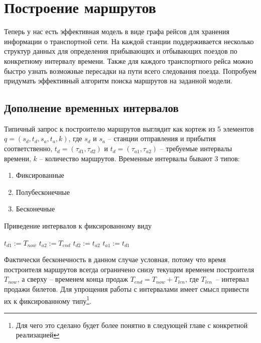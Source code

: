 \section{Построение маршрутов}
Теперь у нас есть эффективная модель в виде графа рейсов для хранения информации о транспортной сети. На каждой станции поддерживается несколько структур данных для определения прибывающих и отбывающих поездов по конкретному интервалу времени. Также для каждого транспортного рейса можно быстро узнать возможные пересадки на пути всего следования поезда. Попробуем придумать эффективный алгоритм поиска маршрутов на заданной модели.

\subsection{Дополнение временных интервалов}
Типичный запрос к построителю маршрутов выглядит как кортеж из 5 элементов $q = (s_d, t_d, s_a, t_a, k)$, где $s_d$ и $s_a$ -- станции отправления и прибытия соответственно, $t_d=(\tau_{d1}, \tau_{d2})$ и $t_d=(\tau_{a1}, \tau_{a2})$ -- требуемые интервалы времени, $k$ -- количество маршрутов. Временные интервалы бывают 3 типов:
\begin{enumerate}
	\item Фиксированные
	\item Полубесконечные
	\item Бесконечные
\end{enumerate}

\begin{algorithm}[!h]
	\caption{Приведение интервалов к фиксированному виду}\label{lst5}
	\begin{algorithmic}
			\State $t_{d1} := T_{now}$
		\EndIf
			\State $t_{a2} := T_{end}$
		\EndIf
			\State $t_{d2} := t_{a2}$
		\EndIf
			\State $t_{a1} := t_{d1}$
		\EndIf
		\EndFunction
	\end{algorithmic}
\end{algorithm}

Фактически бесконечность в данном случае условная, потому что время построителя маршрутов всегда ограничено снизу текущим временем построителя $T_{now}$, а сверху -- временем конца продаж $T_{end} = T_{now} + T_{len}$, где $T_{len}$~-- интервал продажи билетов. Для упрощения работы с интервалами имеет смысл привести их к фиксированному типу\footnote{Для чего это сделано будет более понятно в следующей главе с конкретной реализацией}.
\FloatBarrier 

